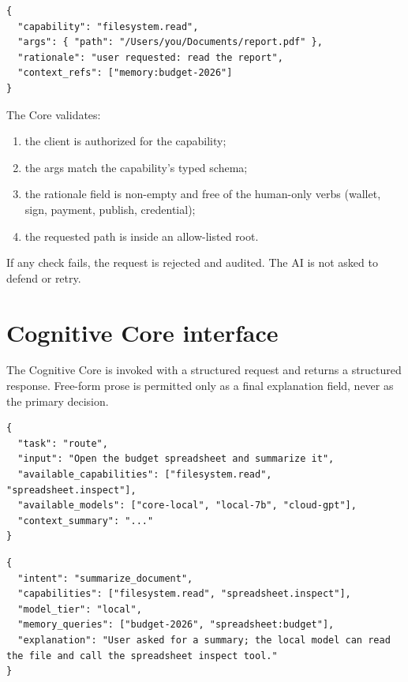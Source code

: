 \begin{lstlisting}[language=rccosjson,caption={Capability execute body.}]
{
  "capability": "filesystem.read",
  "args": { "path": "/Users/you/Documents/report.pdf" },
  "rationale": "user requested: read the report",
  "context_refs": ["memory:budget-2026"]
}
\end{lstlisting}

The Core validates:
\begin{enumerate}
  \item the client is authorized for the capability;
  \item the args match the capability's typed schema;
  \item the rationale field is non-empty and free of the
        human-only verbs (wallet, sign, payment, publish,
        credential);
  \item the requested path is inside an allow-listed root.
\end{enumerate}

If any check fails, the request is rejected and audited. The AI is
not asked to defend or retry.

\section{Cognitive Core interface}

The Cognitive Core is invoked with a structured request and returns
a structured response. Free-form prose is permitted only as a final
explanation field, never as the primary decision.

\begin{lstlisting}[language=rccosjson,caption={Cognitive Core request.}]
{
  "task": "route",
  "input": "Open the budget spreadsheet and summarize it",
  "available_capabilities": ["filesystem.read", "spreadsheet.inspect"],
  "available_models": ["core-local", "local-7b", "cloud-gpt"],
  "context_summary": "..."
}
\end{lstlisting}

\begin{lstlisting}[language=rccosjson,caption={Cognitive Core response.}]
{
  "intent": "summarize_document",
  "capabilities": ["filesystem.read", "spreadsheet.inspect"],
  "model_tier": "local",
  "memory_queries": ["budget-2026", "spreadsheet:budget"],
  "explanation": "User asked for a summary; the local model can read the file and call the spreadsheet inspect tool."
}
\end{lstlisting}

